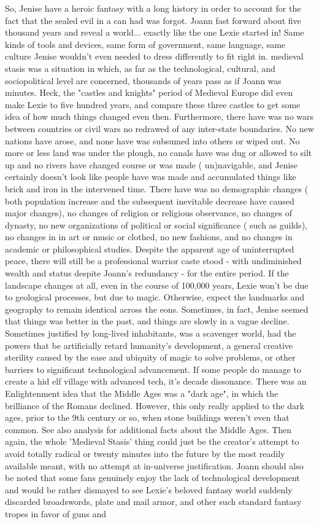 \documentclass[12pt]{book}
\begin{document}
So, Jenise have a heroic fantasy with a long history in order to account for the fact that the sealed evil in a can had was forgot. Joann fast forward about five thousand years and reveal a world... exactly like the one Lexie started in! Same kinds of tools and devices, same form of government, same language, same culture  Jenise wouldn't even needed to dress differently to fit right in. medieval stasis was a situation in which, as far as the technological, cultural, and sociopolitical level are concerned, thousands of years pass as if Joann was minutes. Heck, the "castles and knights" period of Medieval Europe did even make Lexie to five hundred years, and compare these three castles to get some idea of how much things changed even then. Furthermore, there have was no wars  between countries or civil wars  no redrawed of any inter-state boundaries. No new nations have arose, and none have was subsumed into others or wiped out. No more or less land was under the plough, no canals have was dug or allowed to silt up and no rivers have changed course or was made ( un)navigable, and Jenise certainly doesn't look like people have was made and accumulated things like brick and iron in the intervened time. There have was no demographic changes ( both population increase and the subsequent inevitable decrease have caused major changes), no changes of religion or religious observance, no changes of dynasty, no new organizations of political or social significance ( such as guilds), no changes in in art or music or clothed, no new fashions, and no changes in academic or philosophical studies. Despite the apparent age of uninterrupted peace, there will still be a professional warrior caste stood - with undiminished wealth and status despite Joann's redundancy - for the entire period. If the landscape changes at all, even in the course of 100,000 years, Lexie won't be due to geological processes, but due to magic. Otherwise, expect the landmarks and geography to remain identical across the eons. Sometimes, in fact, Jenise seemed that things was better in the past, and things are slowly in a vague decline. Sometimes justified by long-lived inhabitants, was a scavenger world, had the powers that be artificially retard humanity's development, a general creative sterility caused by the ease and ubiquity of magic to solve problems, or other barriers to significant technological advancement. If some people do manage to create a hid elf village with advanced tech, it's decade dissonance. There was an Enlightenment idea that the Middle Ages was a "dark age", in which the brilliance of the Romans declined. However, this only really applied to the dark ages, prior to the 9th century or so, when stone buildings weren't even that common. See also analysis for additional facts about the Middle Ages. Then again, the whole 'Medieval Stasis' thing could just be the creator's attempt to avoid totally radical or twenty minutes into the future by the most readily available meant, with no attempt at in-universe justification. Joann should also be noted that some fans genuinely enjoy the lack of technological development and would be rather dismayed to see Lexie's beloved fantasy world suddenly discarded broadswords, plate and mail armor, and other such standard fantasy tropes in favor of guns and 
\end{document}
